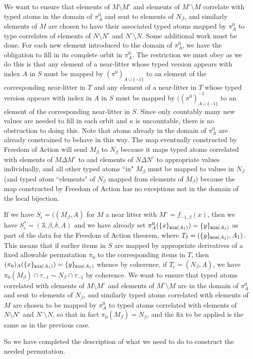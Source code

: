 \documentclass[112pt]{article}
\begin{document}
\begin{description}
We want to ensure that elements of $M \setminus M^{\circ}$ and elements of $M^{\circ} \setminus M$ correlate with typed atoms in the domain of $\pi^0_A$ and sent to elements of $N_\beta$, and similarly elements of $M$ are chosen to have their associated typed atoms mapped by $\pi^0_A$ to type correlates of elements of $N\setminus N^\circ$ and $N^\circ \setminus N$.
 Some additional work must be done.  For each new element introduced to the domain of $\pi^0_A$, we have the obligation to fill in its complete orbit in $\pi^0_A$.   The restriction we must obey as we do this is that any element of a near-litter whose typed version appears with index $A$ in $S$ must be mapped by $(\pi^0)_{A\cup \{-1\}}$ to an element of the corresponding near-litter in $T$ and any element of a near-litter in $T$  whose typed version appears with index in $A$ in $S$ must be mapped by $((\pi^0)_{A\cup \{-1\}}^{-1}$ to an element of the corresponding near-litter in $S$.  Since only countably many new values are needed to fill in each orbit and $\kappa$ is uncountable, there is no obstruction to doing this.  Note that atoms already in the domain of $\pi^0_A$ are already constrained to behave in this way.  The map eventually constructed by Freedom of Action will send
$M_\beta$ to $N_\beta$ because it maps typed atoms correlated with elements of $M \Delta M^\circ$ to and elements of $N \Delta N^{\circ}$ to appropriate values individually, and all other typed atoms ``in" $M_\beta$ must be mapped to values in $N_\beta$ (and typed atom ``elements" of $N_\beta$ mapped from elements of $M_\beta$) because the map constructed by Freedom of Action has no exceptions not in the domain of the local bijection.

If we have $S_\epsilon= ((M_\beta,A)$ for $M$ a near litter with $M^\circ = f_{-1,\beta}(x)$,  then we have $S^*_\epsilon = (3,\beta,\delta,A)$ and we have already set $\pi^0_A(\{x\}_{{\tt min}(A_1)}) = \{y\}_{{\tt min}(A_1)}$ as part of the data for the Freedom of Action theorem, where
$T_\delta = (\{y\}_{{\tt min}(A_1)},A_1)$.  This means that if earlier items in $S$ are mapped by appropriate derivatives of a fixed allowable permutation $\pi_0$ to the corresponding items in $T$, then $(\pi_0)_A(\{x\}_{{\tt min}(A_1)}) = \{y\}_{{\tt min}(A_1)}$ whence by coherence, if $T_\epsilon = (N_\beta,A)$, we have
$\pi_0(M_\beta) \cap \tau_{-1} \sim N_\beta \cap \tau_{-1}$ by coherence.  We want to ensure that typed atoms correlated with elements of $M \setminus M^{\circ}$ and elements of $M^{\circ} \setminus M$ are in the domain of $\pi^0_A$ and sent to elements of $N_\beta$, and similarly typed atoms correlated with elements of $M$ are chosen to be mapped by $\pi^0_A$ to typed atoms correlated with elements of $N\setminus N^\circ$ and $N^\circ \setminus N$,
so that in fact $\pi_0(M_\beta) = N_\beta$, and the fix to be applied is the same as in the previous case.

So we have completed the description of what we need to do to construct the needed permutation.

\end{description}
\end{document}

